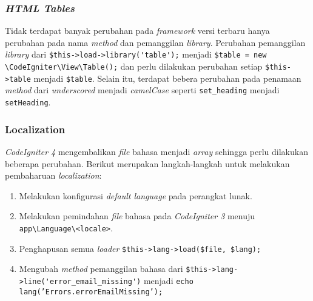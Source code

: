 \subsubsection{\textit{HTML Tables}}

Tidak terdapat banyak perubahan pada \textit{framework} versi terbaru hanya perubahan pada nama \textit{method} dan pemanggilan \textit{library}. Perubahan pemanggilan \textit{library} dari \verb|$this->load->library('table');| menjadi \verb|$table = new \CodeIgniter\View\Table();| dan perlu dilakukan perubahan setiap \verb|$this->table| menjadi \verb|$table|. Selain itu, terdapat bebera perubahan pada penamaan \textit{method} dari \textit{underscored} menjadi \textit{camelCase} seperti \texttt{set\_heading} menjadi \texttt{setHeading}.


\subsubsection{Localization}

\textit{CodeIgniter 4} mengembalikan \textit{file} bahasa menjadi \textit{array} sehingga perlu dilakukan beberapa perubahan. Berikut merupakan langkah-langkah untuk melakukan pembaharuan \textit{localization}:
\begin{enumerate}
	\item Melakukan konfigurasi \textit{default language} pada perangkat lunak.
	\item Melakukan pemindahan \textit{file} bahasa pada \textit{CodeIgniter 3} menuju \verb|app\Language\<locale>|.
	\item Penghapusan semua \textit{loader} \verb|$this->lang->load($file, $lang);|
	\item Mengubah \textit{method} pemanggilan bahasa dari \verb|$this->lang->line('error_email_missing')| menjadi \texttt{echo lang('Errors.errorEmailMissing');}
\end{enumerate}  
 

